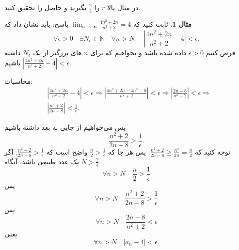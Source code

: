 \documentclass[12pt,a4paper]{article}
\theoremstyle{definition}
\newtheorem{mesal}[thm]{مثال}
\begin{document}
در مثال بالا 
$r$
را
$\frac{2}{3}$
بگیرید و حاصل را تحقیق کنید. 
\begin{mesal}
ثابت کنید که 
$\lim_{n \to \infty} \frac{4n^2+2n}{n^2+2}=4$
\newline
پاسخ:
باید نشان داد که
\[
\forall \epsilon>0 \quad \exists N_\epsilon\in \mathbb{N}
\quad \forall n>N_\epsilon \quad |\frac{4n^2+2n}{n^2+2}-4|<\epsilon.
\]
فرض کنیم 
$\epsilon >0$
داده شده باشد و بخواهیم که برای
$n$
های بزرگتر از
یک
$N_\epsilon$
داشته باشیم
$|\frac{4n^2+2n}{n^2+2}-4|<\epsilon$.
\begin{framed}
محاسبات: 
\begin{align*}
& |\frac{4n^2+2n}{n^2+2}-4|<\epsilon\Rightarrow |\frac{4n^2+2n-4n^2-8}{n^2+2}|<\epsilon\Rightarrow |\frac{2n-8}{n^2+2}|<\epsilon\Rightarrow\\
& |\frac{n^2+2}{2n-8}|<\frac{1}{\epsilon}.
\end{align*}
\end{framed}
پس می‌خواهیم از جایی به بعد داشته باشیم
\[
\frac{n^2+2}{2n-8}>\frac{1}{\epsilon}.
\]
توجه کنید که
$\frac{n^2+2}{2n-8}\geq \frac{n^2}{2n}=\frac{n}{2}$.
پس هر جا که
$\frac{n}{2}>\frac{1}{\epsilon}$
واضح است که 
$\frac{n^2+2}{2n-8}>\frac{1}{\epsilon}$.
اگر
$N>\frac{2}{\epsilon}$
یک عدد طبیعی باشد، آنگاه 
\[
\forall n>N \quad \frac{n}{2}>\frac{1}{\epsilon}
\]
پس
\[
\forall n>N \quad \frac{n^2+2}{2n-8}>\frac{1}{\epsilon}
\]
پس
\[
\forall n>N \quad \frac{2n-8}{n^2+2}<\epsilon
\]
یعنی
\[
\forall n>N \quad |a_n-4|<\epsilon.
\]
\end{mesal}
\end{document}
